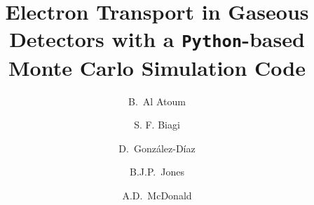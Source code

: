 \documentclass[3p,11pt]{elsarticle}
\begin{document}
\begin{frontmatter}



\title{Electron Transport in Gaseous Detectors with a {\tt Python}-based Monte Carlo Simulation Code}

%
\author[1]{B.~Al Atoum }
%
\author[2]{S. F. Biagi}
%
\author[3]{D.~Gonz\'alez-D\'iaz}
%
\author[1]{B.J.P.~Jones}
%
\author[1]{A.D.~McDonald}


\address[1]{
Department of Physics, University of Texas at Arlington, Arlington, TX 76019, USA}

\address[2]{
University of Liverpool, Physics Department, Liverpool L69 7ZE, United Kingdom}


\address[3]{
Instituto Galego de F\'isica de Altas Enerx\'ias, Univ.\ de Santiago de Compostela, Campus sur, R\'ua Xos\'e Mar\'ia Su\'arez N\'u\~nez, s/n, Santiago de Compostela, E-15782, Spain}



\end{frontmatter}
\end{document}
